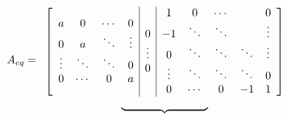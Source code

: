 \documentclass[titlepage,a4paper]{article}
\begin{document}
    \begin{equation}
        \begin{aligned}
            A_{eq}=
            \begin{array}{c@{\hspace{10pt}}c@{\hspace{10pt}}c}
                \left[
                    \begin{array}{c|c|c} 
                        \begin{matrix}
                            a & 0 & \cdots & 0 \\
                            0 & a & \ddots & \vdots \\
                            \vdots & \ddots & \ddots & 0 \\
                            0 & \cdots & 0 & a \\
                        \end{matrix} & 
                        \begin{matrix}  
                            0 \\ 
                            \vdots \\
                            0 \\
                        \end{matrix} &
                        \begin{matrix}  
                            1 & 0 & \cdots&  & 0\\ 
                            -1 & \ddots&  \ddots & & \vdots \\
                            0 & \ddots &  \ddots & \ddots& \vdots \\
                            \vdots & \ddots & \ddots& \ddots& 0\\
                            0 & \cdots & 0 & -1 & 1 \\
                        \end{matrix}
                    \end{array}
                \right] \\
                \underbrace{\hphantom{
                    \begin{array}{cccc} 
                        a & 0 & \cdots & 0 \\
                        0 & a & \ddots & \vdots \\
                        \vdots & \ddots & \ddots & 0 \\
                        0 & \cdots & 0 & a \\

\end{array}}}
\end{array}
\end{aligned}
\end{equation}
\end{document}
